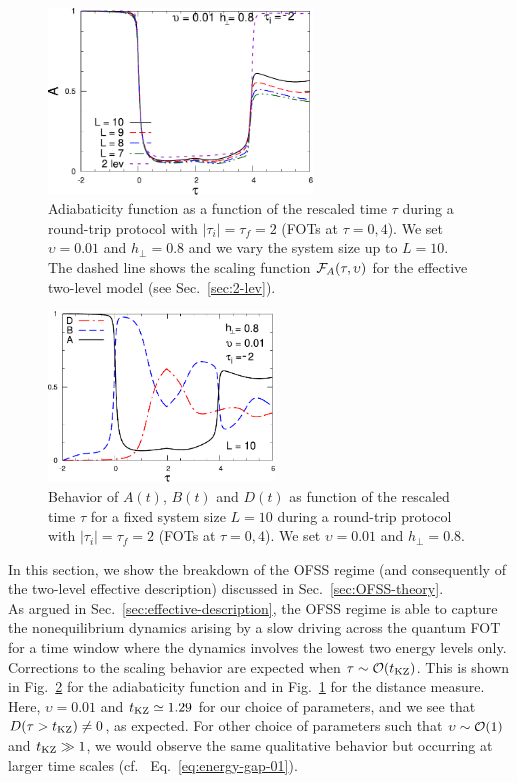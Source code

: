 	\begin{figure}[!h]
		\centering
		\includegraphics[width=7cm]{imm/tripAt2u001g08-new.pdf}
		\caption{Adiabaticity function as a function of the rescaled time $\tau$ during a round-trip protocol with $|\tau_i|=\tau_f =2$ (FOTs at $\tau=0,4$). We set $\upsilon = 0.01$ and $h_\perp = 0.8$ and we vary the system size up to $L = 10$.  The dashed line shows the scaling function ${\cal F}_A(\tau,\upsilon)$ for the effective two-level model (see Sec.~\ref{sec:2-lev}).}
		\label{tripAt2u001g08}
	\end{figure}

	\begin{figure}[!h]
		\centering
		\includegraphics[width=6cm]{imm/tripABDt2u001g08L10-new.pdf}
		\caption{Behavior of $A(t)$, 
		$B(t)$ and $D(t)$ as function of the rescaled time $\tau$ 
		 for a fixed system size $L = 10$ during a round-trip protocol with $|\tau_i|=\tau_f=2$ (FOTs at $\tau=0,4$). We set $\upsilon = 0.01$ and $h_\perp = 0.8$.}
		\label{tripABDt2u001g08L10}
	\end{figure}
In this section, we show the breakdown of the OFSS regime (and consequently of the two-level effective description) discussed in Sec.~\ref{sec:OFSS-theory}. \\

As argued in Sec.~\ref{sec:effective-description}, the OFSS regime is able to capture the nonequilibrium dynamics arising by a slow driving across the quantum FOT for a time window where the dynamics involves the lowest two energy levels only. Corrections to the scaling behavior are expected when $\tau\sim{\cal O}(t_{\rm KZ})$. This is shown in Fig.~\ref{tripABDt2u001g08L10} for the adiabaticity function and in Fig.~\ref{tripAt2u001g08} for the distance measure. Here, $\upsilon=0.01$ and $t_{\rm KZ}\simeq 1.29$ for our choice of parameters, and we see that $D(\tau>t_{\rm KZ})\neq 0$, as expected. For other choice of parameters such that $\upsilon\sim{\cal O}(1)$ and $t_{\rm KZ}\gg 1$, we would observe the same qualitative behavior but occurring at larger time scales (cf.~ Eq.~\eqref{eq:energy-gap-01}).



